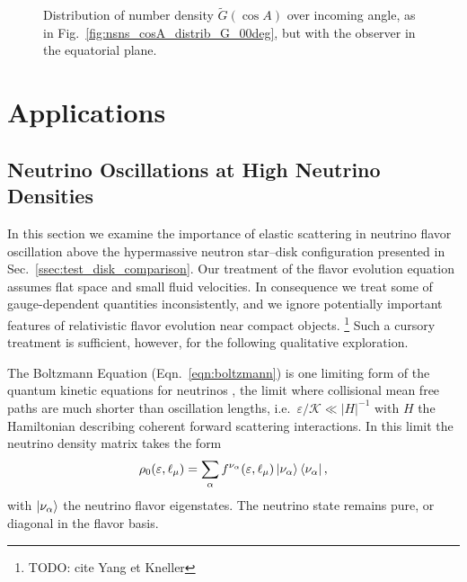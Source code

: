 \documentclass[aps,floatfix,prd,superscriptaddress,twocolumn]{revtex4-1}
\begin{document}
\begin{figure}
  \resizebox{\columnwidth}{!}{}
  \caption{Distribution of number density $\tilde{G}(\cos A)$ over incoming angle,
    as in Fig.~\ref{fig:nsns_cosA_distrib_G_00deg},
    but with the observer in the equatorial plane.}
  \label{fig:nsns_cosA_distrib_G_90deg}
\end{figure}

\section{Applications}
\label{sec:applications}

\subsection{Neutrino Oscillations at High Neutrino Densities}
\label{ssec:V_nunu}
In this section we examine the importance of elastic scattering in neutrino
flavor oscillation above the hypermassive neutron star--disk configuration
presented in Sec.~\ref{ssec:test_disk_comparison}.
Our treatment of the flavor evolution equation assumes flat space and small fluid
velocities.
In consequence we treat some of gauge-dependent quantities inconsistently,
and we ignore potentially important features of relativistic flavor evolution
near compact objects.
\footnote{TODO: cite Yang et Kneller}
Such a cursory treatment is sufficient, however, for the following qualitative
exploration.

The Boltzmann Equation (Eqn.~\ref{eqn:boltzmann}) is one limiting
form of the quantum kinetic equations for neutrinos
\cite{vlas2014-neutrino_qkes},
the limit where collisional mean free paths are much shorter
than oscillation lengths, i.e.\ $\varepsilon/\mathscr{K} \ll |H|^{-1}$
with $H$ the Hamiltonian describing coherent forward scattering interactions.
In this limit the neutrino density matrix takes the form
\begin{equation}
  \label{eqn:density_rho_0}
  \rho_0(\varepsilon,\ell_\mu) =
  \sum\limits_{\alpha}f^{\nu_\alpha}(\varepsilon,\ell_\mu)
  \ket{\nu_\alpha} \bra{\nu_\alpha},
\end{equation}
with $\ket{\nu_\alpha}$ the neutrino flavor eigenstates.
The neutrino state remains pure, or diagonal in the flavor basis.
\end{document}
